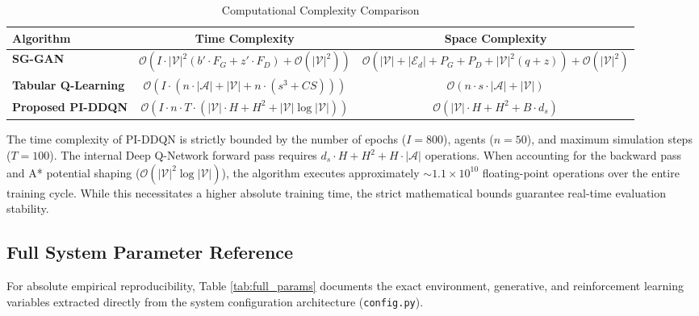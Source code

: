 \documentclass[journal, a4paper, twocolumn]{IEEEtran}
\begin{document}
\begin{table}[htbp]
\centering
\caption{Computational Complexity Comparison}
\label{tab:computational_complexity}
\footnotesize
\begin{tabular}{@{}l c c@{}}
\toprule
\textbf{Algorithm} & \textbf{Time Complexity} & \textbf{Space Complexity} \\ \midrule
\textbf{SG-GAN} & $\mathcal{O}\left(I \cdot |\mathcal{V}|^2 (b' \cdot F_G + z' \cdot F_D) + \mathcal{O}(|\mathcal{V}|^2)\right)$ & $\mathcal{O}\left(|\mathcal{V}| + |\mathcal{E}_d| + P_G + P_D + |\mathcal{V}|^2(q+z) \right) + \mathcal{O}(|\mathcal{V}|^2)$ \\ 
\textbf{Tabular Q-Learning} & $\mathcal{O}\left(I \cdot (n \cdot |\mathcal{A}| + |\mathcal{V}| + n \cdot (s^3 + CS))\right)$ & $\mathcal{O}\left(n \cdot s \cdot |\mathcal{A}| + |\mathcal{V}|\right)$ \\ 
\textbf{Proposed PI-DDQN} & $\mathcal{O}\left(I \cdot n \cdot T \cdot (|\mathcal{V}| \cdot H + H^2 + |\mathcal{V}| \log |\mathcal{V}|)\right)$ & $\mathcal{O}\left(|\mathcal{V}| \cdot H + H^2 + B \cdot d_s\right)$ \\ \bottomrule
\end{tabular}
\end{table}

The time complexity of PI-DDQN is strictly bounded by the number of epochs ($I = 800$), agents ($n = 50$), and maximum simulation steps ($T = 100$). The internal Deep Q-Network forward pass requires $d_s \cdot H + H^2 + H \cdot |\mathcal{A}|$ operations. When accounting for the backward pass and A* potential shaping ($\mathcal{O}(|\mathcal{V}|^2 \log |\mathcal{V}|)$), the algorithm executes approximately $\sim 1.1 \times 10^{10}$ floating-point operations over the entire training cycle. While this necessitates a higher absolute training time, the strict mathematical bounds guarantee real-time evaluation stability.

\subsection{Full System Parameter Reference}
For absolute empirical reproducibility, Table \ref{tab:full_params} documents the exact environment, generative, and reinforcement learning variables extracted directly from the system configuration architecture (\texttt{config.py}).
\end{document}

